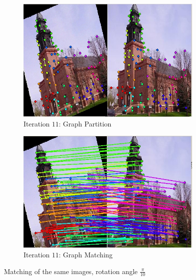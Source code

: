 \documentclass[
	fontsize=12pt,
	paper=a4,
	twoside=false,
	numbers=noenddot,
	plainheadsepline,
	toc=listof,
	toc=bibliography
]{scrartcl}
\begin{document}
\begin{figure}[ht]
	\begin{subfigure}[b]{0.5\textwidth}
		\centering
		\includegraphics[scale=0.35]{fig/method2/test_imagetrafo2/partition_it11.jpg} 
		\caption{Iteration $11$: Graph Partition} 
	\end{subfigure}%
	\begin{subfigure}[b]{0.5\textwidth}
		\centering
		\includegraphics[scale=0.35]{fig/method2/test_imagetrafo2/LL_it11.jpg} 
		\caption{Iteration $11$: Graph Matching} 
	\end{subfigure} 
	\caption{Matching of the same images, rotation angle $\frac{\pi}{10}$}
	

\end{figure}
\end{document}
